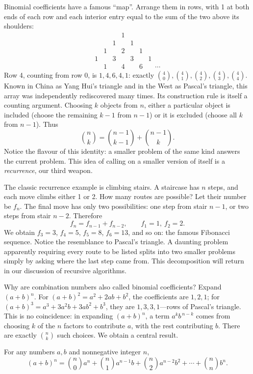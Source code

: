 Binomial coefficients have a famous ``map''. Arrange them in rows, with 1 at both ends of each row and each interior entry equal to the sum of the two above its shoulders:
\[
\begin{array}{ccccccc}
& & & 1 & & &\\
& & 1 & & 1 & &\\
& 1 & & 2 & & 1 &\\
1 & & 3 & & 3 & & 1\\
& 1 & & 4 & & 6 & \quad\cdots
\end{array}
\]
Row 4, counting from row 0, is $1,4,6,4,1$: exactly $\binom{4}{0},\binom{4}{1},\binom{4}{2},\binom{4}{3},\binom{4}{4}$. Known in China as Yang Hui's triangle and in the West as Pascal's triangle, this array was independently rediscovered many times. Its construction rule is itself a counting argument. Choosing $k$ objects from $n$, either a particular object is included (choose the remaining $k-1$ from $n-1$) or it is excluded (choose all $k$ from $n-1$). Thus
\[
\binom{n}{k}=\binom{n-1}{k-1}+\binom{n-1}{k}.
\]
Notice the flavour of this identity: a smaller problem of the same kind answers the current problem. This idea of calling on a smaller version of itself is a \emph{recurrence}, our third weapon.

The classic recurrence example is climbing stairs. A staircase has $n$ steps, and each move climbs either 1 or 2. How many routes are possible? Let their number be $f_n$. The final move has only two possibilities: one step from stair $n-1$, or two steps from stair $n-2$. Therefore
\[
f_n=f_{n-1}+f_{n-2},\qquad f_1=1,\ f_2=2.
\]
We obtain $f_3=3$, $f_4=5$, $f_5=8$, $f_6=13$, and so on: the famous Fibonacci sequence. Notice the resemblance to Pascal's triangle. A daunting problem apparently requiring every route to be listed splits into two smaller problems simply by asking where the last step came from. This decomposition will return in our discussion of recursive algorithms.

Why are combination numbers also called binomial coefficients? Expand $(a+b)^n$. For $(a+b)^2=a^2+2ab+b^2$, the coefficients are $1,2,1$; for $(a+b)^3=a^3+3a^2b+3ab^2+b^3$, they are $1,3,3,1$---rows of Pascal's triangle. This is no coincidence: in expanding $(a+b)^n$, a term $a^k b^{\,n-k}$ comes from choosing $k$ of the $n$ factors to contribute $a$, with the rest contributing $b$. There are exactly $\binom{n}{k}$ such choices. We obtain a central result.

\begin{dingli}
For any numbers $a,b$ and nonnegative integer $n$,
\[
(a+b)^n=\binom{n}{0}a^n+\binom{n}{1}a^{n-1}b+\binom{n}{2}a^{n-2}b^2+\cdots+\binom{n}{n}b^n.
\]
\end{dingli}

